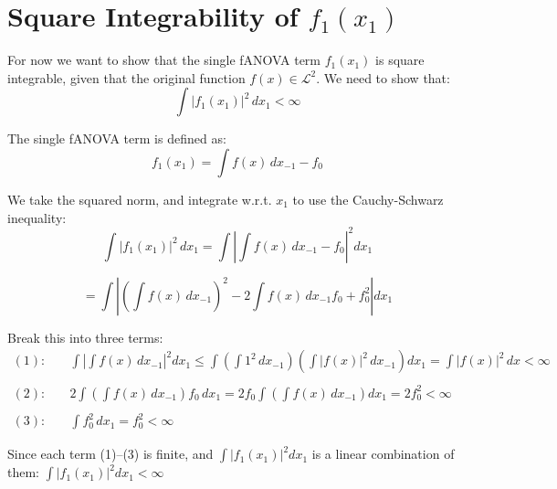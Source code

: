 \section*{Square Integrability of \( f_1(x_1) \)}

For now we want to show that the single fANOVA term \( f_1(x_1) \) is square integrable, given that the original function $f(x) \in \mathcal{L}^2$. We need to show that:
\[
\int |f_1(x_1)|^2 \, dx_1 < \infty
\]

The single fANOVA term is defined as:
\[
f_1(x_1) = \int f(x) \, dx_{-1} - f_0
\]

We take the squared norm, and integrate w.r.t. \( x_1 \) to use the Cauchy-Schwarz inequality:
\[
\int |f_1(x_1)|^2 \, dx_1 
= \int \left| \int f(x) \, dx_{-1} - f_0 \right|^2 dx_1
\]

\[
= \int | (\int f(x) \, dx_{-1})^2 
- 2 \int f(x) \, dx_{-1} f_0 
+ f_0^2 | dx_1
\]

Break this into three terms:
\begin{align*}
(1): &\quad \int \left| \int f(x) \, dx_{-1} \right|^2 dx_1 
\leq \int \left( \int 1^2 \, dx_{-1} \right) \left( \int |f(x)|^2 \, dx_{-1} \right) dx_1 
= \int |f(x)|^2 \, dx < \infty \\
\\
(2): &\quad 2 \int \left( \int f(x) \, dx_{-1} \right) f_0 \, dx_1 
= 2 f_0 \int \left( \int f(x) \, dx_{-1} \right) dx_1 
= 2 f_0^2 < \infty \\
\\
(3): &\quad \int f_0^2 \, dx_1 = f_0^2 < \infty
\end{align*}

Since each term (1)–(3) is finite, and \( \int |f_1(x_1)|^2 dx_1 \) is a linear combination of them: \(\int |f_1(x_1)|^2 dx_1 < \infty\)





